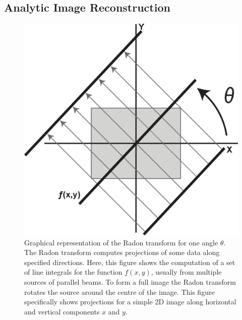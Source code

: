         \subsection{Analytic Image Reconstruction} \label{sec:analytic_image_reconstruction}
            \begin{figure}
                \centering
                    
                \includegraphics[width=1.0\linewidth]{figures/background_radon_transform.png}
                    
                \captionsetup{singlelinecheck=false}
                \caption{
                    Graphical representation of the Radon transform for one angle $\theta$. The Radon transform computes projections of some data along specified directions. Here, this figure shows the computation of a set of line integrals for the function $f(x, y)$, usually from multiple sources of parallel beams. To form a full image the Radon transform rotates the source around the centre of the image. This figure specifically shows projections for a simple \gls{2D} image along horizontal and vertical components $x$ and $y$.
                }
                \label{fig:analytic_image_reconstruction_radon_transform}
            \end{figure}
            
